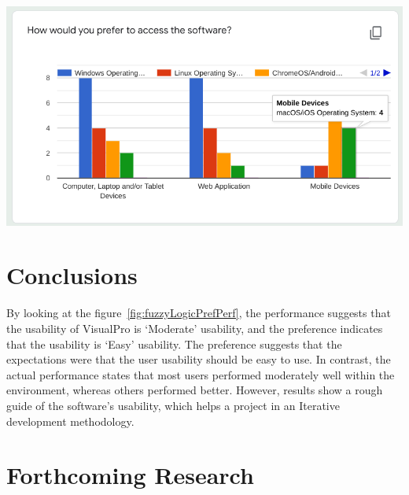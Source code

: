 \documentclass[a0,portrait]{a0poster}
\begin{document}
\begin{multicols}{2}
\begin{center}\vspace{1cm}
\includegraphics[width=0.55\linewidth]{../../Showcase-Work_Completed/Surveying/q12.png}
\label{fig:q-12}
\end{center}\vspace{1cm}


\color{DarkRed} %

\section*{Conclusions}
By looking at the figure~\ref{fig:fuzzyLogicPrefPerf}, the performance suggests that the usability of VisualPro is `Moderate' usability, and the preference indicates that the usability is `Easy' usability. The preference suggests that the expectations were that the user usability should be easy to use. In contrast, the actual performance states that most users performed moderately well within the environment, whereas others performed better. However, results show a rough guide of the software's usability, which helps a project in an Iterative development methodology.

\color{DarkSlateGray} %


\section*{Forthcoming Research}


\end{multicols}
\end{document}
